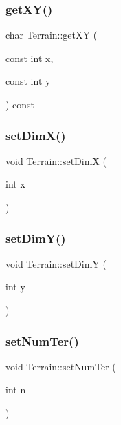 \mbox{\label{class_terrain_a60a33d464cfb8468e26f1b4dee525178}} 
\subsubsection{\texorpdfstring{get\+X\+Y()}{getXY()}}
{\footnotesize\ttfamily char Terrain\+::get\+XY (\begin{DoxyParamCaption}\item[{const int}]{x,  }\item[{const int}]{y }\end{DoxyParamCaption}) const}

\mbox{\label{class_terrain_a97e790dd5379c05db3515d90b2f54b02}} 
\subsubsection{\texorpdfstring{set\+Dim\+X()}{setDimX()}}
{\footnotesize\ttfamily void Terrain\+::set\+DimX (\begin{DoxyParamCaption}\item[{int}]{x }\end{DoxyParamCaption})}

\mbox{\label{class_terrain_a4fad5f05f2d96ca8ad0cb6442c218df4}} 
\subsubsection{\texorpdfstring{set\+Dim\+Y()}{setDimY()}}
{\footnotesize\ttfamily void Terrain\+::set\+DimY (\begin{DoxyParamCaption}\item[{int}]{y }\end{DoxyParamCaption})}

\mbox{\label{class_terrain_a8982e144bbc068fb1904092edf327d75}} 
\subsubsection{\texorpdfstring{set\+Num\+Ter()}{setNumTer()}}
{\footnotesize\ttfamily void Terrain\+::set\+Num\+Ter (\begin{DoxyParamCaption}\item[{int}]{n }\end{DoxyParamCaption})}



